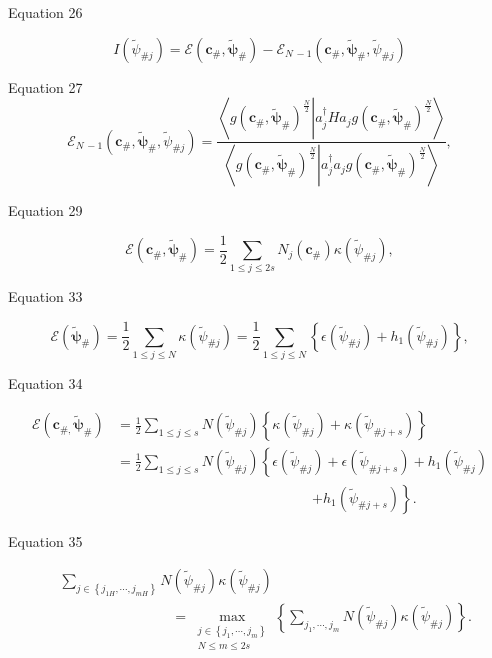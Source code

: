 \documentclass[aps]{revtex4}%
\begin{document}
Equation 26%

\[
I\left(  \tilde{\psi}_{\#j}\right)  =\mathcal{E}\left(  \boldsymbol{c}%
_{\#},\boldsymbol{\tilde{\psi}}_{\#}\right)  -\mathcal{E}_{N\,-1}\left(
\boldsymbol{c}_{\#},\boldsymbol{\tilde{\psi}}_{\#},\tilde{\psi}_{\#j}\right)
\]


Equation 27%
\[
\mathcal{E}_{N\,-1}\left(  \boldsymbol{c}_{\#},\boldsymbol{\tilde{\psi}}%
_{\#},\tilde{\psi}_{\#j}\right)  =\frac{\left\langle \left.  g\left(
\boldsymbol{c}_{\#},\boldsymbol{\tilde{\psi}}_{\#}\right)  ^{\frac{N}{2}%
}\right\vert a_{j}^{\dagger}Ha_{j}g\left(  \boldsymbol{c}_{\#}%
,\boldsymbol{\tilde{\psi}}_{\#}\right)  ^{\frac{N}{2}}\right\rangle
}{\left\langle \left.  g\left(  \boldsymbol{c}_{\#},\boldsymbol{\tilde{\psi}%
}_{\#}\right)  ^{\frac{N}{2}}\right\vert a_{j}^{\dagger}a_{j}g\left(
\boldsymbol{c}_{\#},\boldsymbol{\tilde{\psi}}_{\#}\right)  ^{\frac{N}{2}%
}\right\rangle },
\]
\bigskip

Equation 29%

\[
\mathcal{E}\left(  \boldsymbol{c}_{\#},\boldsymbol{\tilde{\psi}}_{\#}\right)
=\frac{1}{2}\sum_{1\leq j\leq2s}N_{j}\left(  \boldsymbol{c}_{\#}\right)
\kappa\left(  \tilde{\psi}_{\#j}\right)  ,
\]


Equation 33%

\[
\mathcal{E}\left(  \boldsymbol{\tilde{\psi}}_{\#}\right)  =\frac{1}{2}%
\sum_{1\leq j\leq N}\kappa\left(  \tilde{\psi}_{\#j}\right)  =\frac{1}{2}%
\sum_{1\leq j\leq N}\left\{  \epsilon\left(  \tilde{\psi}_{\#j}\right)
+h_{1}\left(  \tilde{\psi}_{\#j}\right)  \right\}  ,
\]


Equation 34%

\begin{align*}
\mathcal{E}\left(  \boldsymbol{c}_{\#,}\boldsymbol{\tilde{\psi}}_{\#}\right)
&  =\frac{1}{2}\sum_{1\leq j\leq s}N\left(  \tilde{\psi}_{\#j}\right)
\left\{  \kappa\left(  \tilde{\psi}_{\#j}\right)  +\kappa\left(  \tilde{\psi
}_{\#j+s}\right)  \right\} \\
&  =\frac{1}{2}\sum_{1\leq j\leq s}N\left(  \tilde{\psi}_{\#j}\right)
\left\{  \epsilon\left(  \tilde{\psi}_{\#j}\right)  +\epsilon\left(
\tilde{\psi}_{\#j+s}\right)  +h_{1}\left(  \tilde{\psi}_{\#j}\right)  \right.
\\
&  \qquad\qquad\qquad\qquad\qquad\qquad\qquad\left.  +h_{1}\left(  \tilde
{\psi}_{\#j+s}\right)  \right\}  .
\end{align*}


Equation 35%

\begin{align*}
&  \sum_{j\in\left\{  j_{1H},\cdots,j_{mH}\right\}  }N\left(  \tilde{\psi
}_{\#j}\right)  \kappa\left(  \tilde{\psi}_{\#j}\right) \\
&  \qquad\qquad\qquad\qquad=\max_{\substack{j\in\left\{  j_{1},\cdots
,j_{m}\right\}  \\N\leq m\leq2s}}\left\{  \sum_{j_{1},\cdots,j_{m}}N\left(
\tilde{\psi}_{\#j}\right)  \kappa\left(  \tilde{\psi}_{\#j}\right)  \right\}
.
\end{align*}
\end{document}
